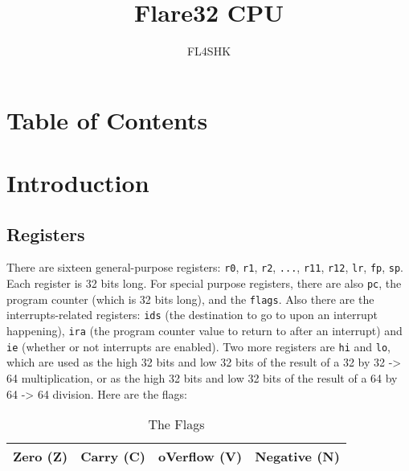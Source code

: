 \documentclass{article}
\title{Flare32 CPU}
\author{FL4SHK}
\makeatletter
\renewcommand\tableofcontents{%
    \@starttoc{toc}%
}
\makeatother
\begin{document}
	\maketitle
	\newpage



	\newpage
	\singlespacing
	\section{Table of Contents}
	\tableofcontents
	\newpage

	\doublespacing
	\section{Introduction}
	\subsection{Registers}
	There are sixteen general-purpose registers: \texttt{r0}, \texttt{r1},
	\texttt{r2}, \texttt{...}, \texttt{r11}, \texttt{r12}, \texttt{lr},
	\texttt{fp}, \texttt{sp}. Each register
	is 32 bits long. For special purpose registers, there are also
	\texttt{pc}, the program counter (which is 32 bits long), and the
	\texttt{flags}. Also there are the interrupts-related registers:
	\texttt{ids} (the destination to go to upon an interrupt happening),
	\texttt{ira} (the program counter value to return to after an
	interrupt) and \texttt{ie} (whether or not interrupts are enabled).
	Two more registers are \texttt{hi} and \texttt{lo}, which are used as
	the high 32 bits and low 32 bits of the result of a 32 by 32 -> 64
	multiplication, or as the high 32 bits and low 32 bits of the result of
	a 64 by 64 -> 64 division. Here are the flags:

	\begin{table}[H]
		\begin{center}
			\caption{The Flags}
			\label{tab:flags}
			\begin{tabular}{|c|c|c|c|}
				\hline
				Zero (Z) & Carry (C) & oVerflow (V) & Negative (N)\\
				\hline
			\end{tabular}
		\end{center}
	\end{table}
\end{document}
